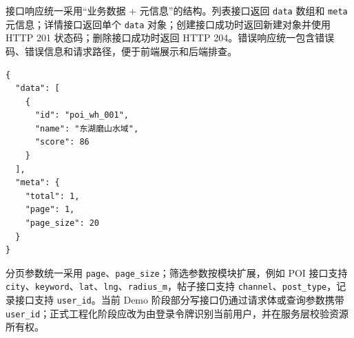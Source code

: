 接口响应统一采用“业务数据 + 元信息”的结构。列表接口返回 \texttt{data} 数组和 \texttt{meta} 元信息；详情接口返回单个 \texttt{data} 对象；创建接口成功时返回新建对象并使用 HTTP 201 状态码；删除接口成功时返回 HTTP 204。错误响应统一包含错误码、错误信息和请求路径，便于前端展示和后端排查。

\begin{lstlisting}[caption={列表接口返回结构示例},label={lst:list-response}]
{
  "data": [
    {
      "id": "poi_wh_001",
      "name": "东湖磨山水域",
      "score": 86
    }
  ],
  "meta": {
    "total": 1,
    "page": 1,
    "page_size": 20
  }
}
\end{lstlisting}

分页参数统一采用 \texttt{page}、\texttt{page\_size}；筛选参数按模块扩展，例如 POI 接口支持 \texttt{city}、\texttt{keyword}、\texttt{lat}、\texttt{lng}、\texttt{radius\_m}，帖子接口支持 \texttt{channel}、\texttt{post\_type}，记录接口支持 \texttt{user\_id}。当前 Demo 阶段部分写接口仍通过请求体或查询参数携带 \texttt{user\_id}；正式工程化阶段应改为由登录令牌识别当前用户，并在服务层校验资源所有权。
